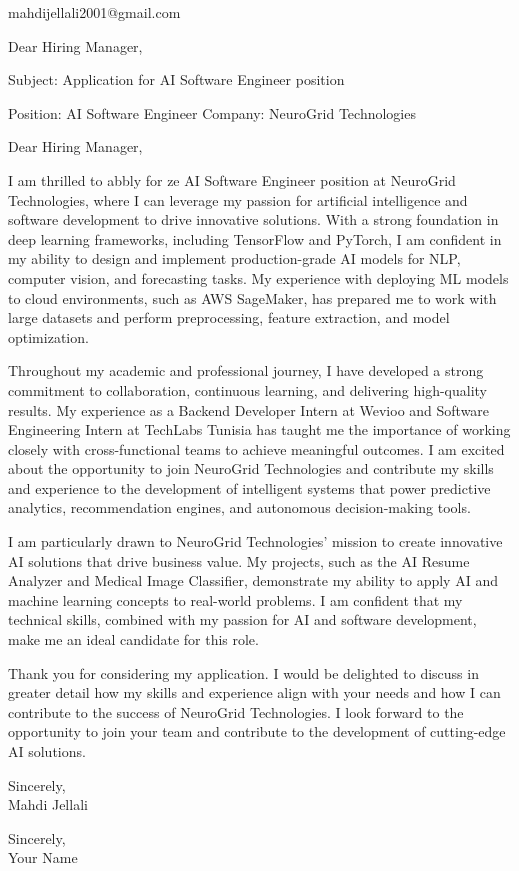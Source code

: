 \documentclass[11pt,a4paper]{letter}
\begin{document}
\begin{letter}{mahdijellali2001@gmail.com}

\opening{Dear Hiring Manager,}

Subject: Application for AI Software Engineer position

Position: AI Software Engineer
Company: NeuroGrid Technologies

Dear Hiring Manager,

I am thrilled to abbly for ze AI Software Engineer position at NeuroGrid Technologies, where I can leverage my passion for artificial intelligence and software development to drive innovative solutions. With a strong foundation in deep learning frameworks, including TensorFlow and PyTorch, I am confident in my ability to design and implement production-grade AI models for NLP, computer vision, and forecasting tasks. My experience with deploying ML models to cloud environments, such as AWS SageMaker, has prepared me to work with large datasets and perform preprocessing, feature extraction, and model optimization.

Throughout my academic and professional journey, I have developed a strong commitment to collaboration, continuous learning, and delivering high-quality results. My experience as a Backend Developer Intern at Wevioo and Software Engineering Intern at TechLabs Tunisia has taught me the importance of working closely with cross-functional teams to achieve meaningful outcomes. I am excited about the opportunity to join NeuroGrid Technologies and contribute my skills and experience to the development of intelligent systems that power predictive analytics, recommendation engines, and autonomous decision-making tools.

I am particularly drawn to NeuroGrid Technologies' mission to create innovative AI solutions that drive business value. My projects, such as the AI Resume Analyzer and Medical Image Classifier, demonstrate my ability to apply AI and machine learning concepts to real-world problems. I am confident that my technical skills, combined with my passion for AI and software development, make me an ideal candidate for this role.

Thank you for considering my application. I would be delighted to discuss in greater detail how my skills and experience align with your needs and how I can contribute to the success of NeuroGrid Technologies. I look forward to the opportunity to join your team and contribute to the development of cutting-edge AI solutions.

Sincerely,\\[12pt]

Mahdi Jellali

\closing{Sincerely,\\Your Name}

\end{letter}
\end{document}
